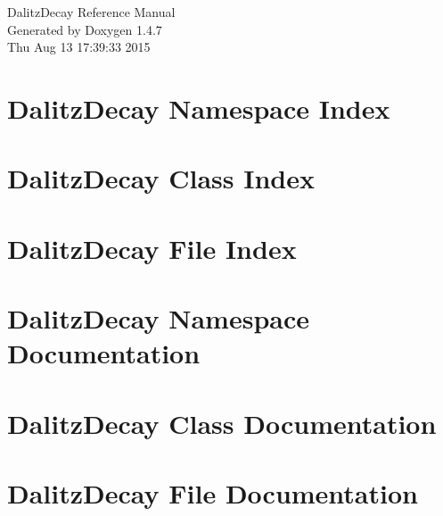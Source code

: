 \documentclass[a4paper]{book}
\begin{document}
\begin{titlepage}
\vspace*{7cm}
\begin{center}
{\Large Dalitz\-Decay Reference Manual}\\
\vspace*{1cm}
{\large Generated by Doxygen 1.4.7}\\
\vspace*{0.5cm}
{\small Thu Aug 13 17:39:33 2015}\\
\end{center}
\end{titlepage}
\clearemptydoublepage
{}
\tableofcontents
\clearemptydoublepage
{}
\chapter{Dalitz\-Decay Namespace Index}

\chapter{Dalitz\-Decay Class Index}

\chapter{Dalitz\-Decay File Index}

\chapter{Dalitz\-Decay Namespace Documentation}


\chapter{Dalitz\-Decay Class Documentation}








\chapter{Dalitz\-Decay File Documentation}








\printindex
\end{document}
